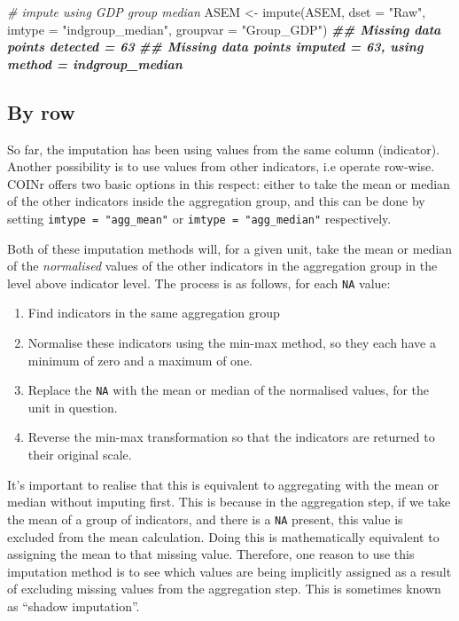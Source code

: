 \documentclass[
]{book}
\newenvironment{Shaded}{\begin{snugshade}}{\end{snugshade}}
\newcommand{\AttributeTok}[1]{\textcolor[rgb]{0.77,0.63,0.00}{#1}}
\newcommand{\CommentTok}[1]{\textcolor[rgb]{0.56,0.35,0.01}{\textit{#1}}}
\newcommand{\DocumentationTok}[1]{\textcolor[rgb]{0.56,0.35,0.01}{\textbf{\textit{#1}}}}
\newcommand{\FunctionTok}[1]{\textcolor[rgb]{0.00,0.00,0.00}{#1}}
\newcommand{\NormalTok}[1]{#1}
\newcommand{\OtherTok}[1]{\textcolor[rgb]{0.56,0.35,0.01}{#1}}
\newcommand{\StringTok}[1]{\textcolor[rgb]{0.31,0.60,0.02}{#1}}
\providecommand{\tightlist}{%
  \setlength{\itemsep}{0pt}\setlength{\parskip}{0pt}}
\begin{document}
\begin{Shaded}
\begin{Highlighting}[]
\CommentTok{\# impute using GDP group median}
\NormalTok{ASEM }\OtherTok{\textless{}{-}} \FunctionTok{impute}\NormalTok{(ASEM, }\AttributeTok{dset =} \StringTok{"Raw"}\NormalTok{, }\AttributeTok{imtype =} \StringTok{"indgroup\_median"}\NormalTok{, }\AttributeTok{groupvar =} \StringTok{"Group\_GDP"}\NormalTok{)}
\DocumentationTok{\#\# Missing data points detected = 63}
\DocumentationTok{\#\# Missing data points imputed = 63, using method = indgroup\_median}
\end{Highlighting}
\end{Shaded}

\hypertarget{by-row}{%
\subsection{By row}\label{by-row}}

So far, the imputation has been using values from the same column (indicator). Another possibility is to use values from other indicators, i.e operate row-wise. COINr offers two basic options in this respect: either to take the mean or median of the other indicators inside the aggregation group, and this can be done by setting \texttt{imtype\ =\ "agg\_mean"} or \texttt{imtype\ =\ "agg\_median"} respectively.

Both of these imputation methods will, for a given unit, take the mean or median of the \emph{normalised} values of the other indicators in the aggregation group in the level above indicator level. The process is as follows, for each \texttt{NA} value:

\begin{enumerate}
\def\labelenumi{\arabic{enumi}.}
\tightlist
\item
  Find indicators in the same aggregation group
\item
  Normalise these indicators using the min-max method, so they each have a minimum of zero and a maximum of one.
\item
  Replace the \texttt{NA} with the mean or median of the normalised values, for the unit in question.
\item
  Reverse the min-max transformation so that the indicators are returned to their original scale.
\end{enumerate}

It's important to realise that this is equivalent to aggregating with the mean or median without imputing first. This is because in the aggregation step, if we take the mean of a group of indicators, and there is a \texttt{NA} present, this value is excluded from the mean calculation. Doing this is mathematically equivalent to assigning the mean to that missing value. Therefore, one reason to use this imputation method is to see which values are being implicitly assigned as a result of excluding missing values from the aggregation step. This is sometimes known as ``shadow imputation''.
\end{document}
